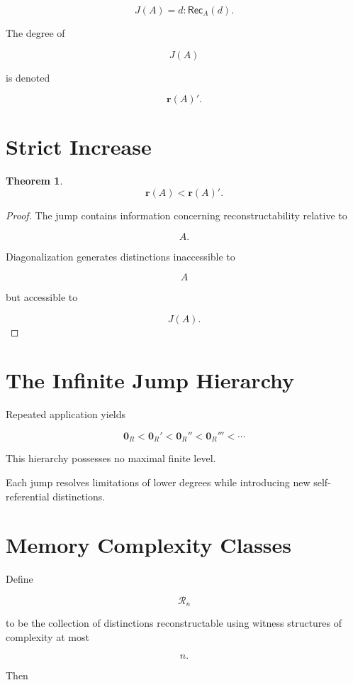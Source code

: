 \documentclass[12pt,oneside]{book}
\theoremstyle{plain} \newtheorem{theorem}{Theorem}[chapter] \newtheorem{lemma}[theorem]{Lemma} \newtheorem{proposition}[theorem]{Proposition} \newtheorem{corollary}[theorem]{Corollary}
\theoremstyle{definition} \newtheorem{definition}[theorem]{Definition} \newtheorem{axiom}[theorem]{Axiom} \newtheorem{construction}[theorem]{Construction}
\theoremstyle{remark} \newtheorem{remark}[theorem]{Remark} \newtheorem{example}[theorem]{Example}
\begin{document}
\[
J(A)
=
{
d :
\mathsf{Rec}_A(d)
}.
\]

The degree of

\[
J(A)
\]

is denoted

\[
\mathbf r(A)'.
\]

\section{Strict Increase}

\begin{theorem}

\[
\mathbf r(A)
<
\mathbf r(A)'.
\]

\end{theorem}

\begin{proof}

The jump contains information concerning reconstructability relative to

\[
A.
\]

Diagonalization generates distinctions inaccessible to

\[
A
\]

but accessible to

\[
J(A).
\]

\end{proof}

\section{The Infinite Jump Hierarchy}

Repeated application yields

\[
\mathbf 0_R
<
\mathbf 0_R'
<
\mathbf 0_R''
<
\mathbf 0_R'''
<
\cdots
\]

This hierarchy possesses no maximal finite level.

Each jump resolves limitations of lower degrees while introducing new self-referential distinctions.

\section{Memory Complexity Classes}

Define

\[
\mathcal R_n
\]

to be the collection of distinctions reconstructable using witness structures of complexity at most

\[
n.
\]

Then
\end{document}
